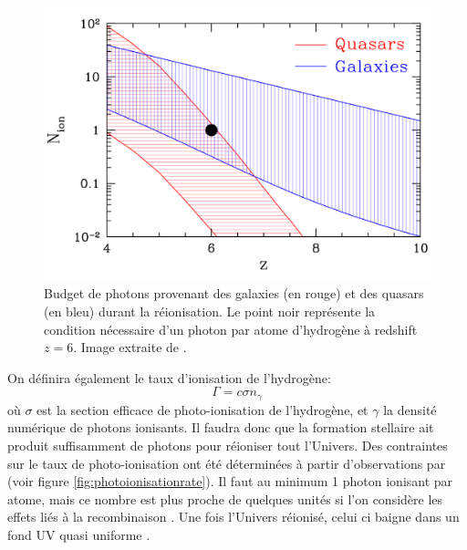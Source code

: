 \begin{figure}
        \includegraphics[width=.9\linewidth]{img/01/gal_AGN.pdf} 
        \caption[Budget de photons galaxies/ quasars]{Budget de photons provenant des galaxies (en rouge) et des quasars (en bleu) durant la réionisation.
        Le point noir représente la condition nécessaire d'un photon par atome d'hydrogène à redshift $z=6$.
        Image extraite de \cite{trac_computer_2011}.
 		\label{fig:gal_AGN} }
\end{figure}




On définira également le taux d'ionisation de l'hydrogène:
\begin{equation}
\Gamma = c \sigma n_\gamma
\end{equation}
où $\sigma$ est la section efficace de photo-ionisation de l'hydrogène, et $\gamma$ la densité numérique de photons ionisants.
Il faudra donc que la formation stellaire ait produit suffisamment de photons pour réioniser tout l'Univers.
Des contraintes sur le taux de photo-ionisation ont été déterminées à partir d'observations par \cite{2013MNRAS.436.1023B} (voir figure \ref{fig:photoionisationrate}).
Il faut au minimum 1 photon ionisant par atome, mais ce nombre est plus proche de quelques unités si l'on considère les effets liés à la recombinaison \citep{aubert_reionization_2010}.
Une fois l'Univers réionisé, celui ci baigne dans un fond UV quasi uniforme \citep{haardt_radiative_2012}.


